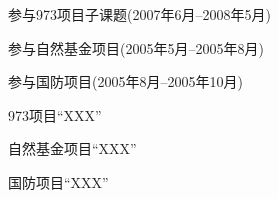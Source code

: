

\begin{projects}
  \item 参与973项目子课题(2007年6月--2008年5月)
  \item 参与自然基金项目(2005年5月--2005年8月)
  \item 参与国防项目(2005年8月--2005年10月)
\end{projects}

\begin{projects*}
  \item 973项目“XXX”
  \item 自然基金项目“XXX”
  \item 国防项目“XXX”
\end{projects*}

